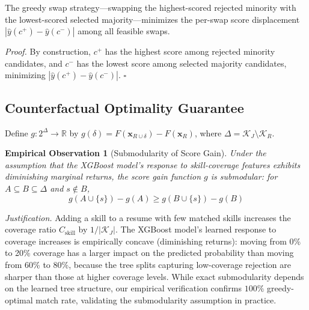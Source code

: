 \documentclass{llncs}
\newtheorem{empiricalobs}{Empirical Observation}
\begin{document}
\begin{proposition}\label{prop:disp}
The greedy swap strategy---swapping the highest-scored rejected minority with the lowest-scored selected majority---minimizes the per-swap score displacement $|\hat{y}(c^+) - \hat{y}(c^-)|$ among all feasible swaps.
\end{proposition}

\textit{Proof.} By construction, $c^+$ has the highest score among rejected minority candidates, and $c^-$ has the lowest score among selected majority candidates, minimizing $|\hat{y}(c^+) - \hat{y}(c^-)|$. \hfill $\square$

\subsection{Counterfactual Optimality Guarantee}\label{sec:cf_theory}

\begin{definition}
Define $g: 2^\Delta \to \mathbb{R}$ by $g(\delta) = F(\mathbf{x}_{R \cup \delta}) - F(\mathbf{x}_R)$, where $\Delta = \mathcal{K}_J \setminus \mathcal{K}_R$.
\end{definition}

\setcounter{empiricalobs}{3}
\begin{empiricalobs}[Submodularity of Score Gain]\label{prop:submod}
Under the assumption that the XGBoost model's response to skill-coverage features exhibits diminishing marginal returns, the score gain function $g$ is submodular: for $A \subseteq B \subseteq \Delta$ and $s \notin B$,
\begin{equation}
    g(A \cup \{s\}) - g(A) \geq g(B \cup \{s\}) - g(B)
\end{equation}
\end{empiricalobs}

\textit{Justification.} Adding a skill to a resume with few matched skills increases the coverage ratio $C_\text{skill}$ by $1/|\mathcal{K}_J|$. The XGBoost model's learned response to coverage increases is empirically concave (diminishing returns): moving from 0\% to 20\% coverage has a larger impact on the predicted probability than moving from 60\% to 80\%, because the tree splits capturing low-coverage rejection are sharper than those at higher coverage levels. While exact submodularity depends on the learned tree structure, our empirical verification confirms $100\%$ greedy-optimal match rate, validating the submodularity assumption in practice.
\end{document}
